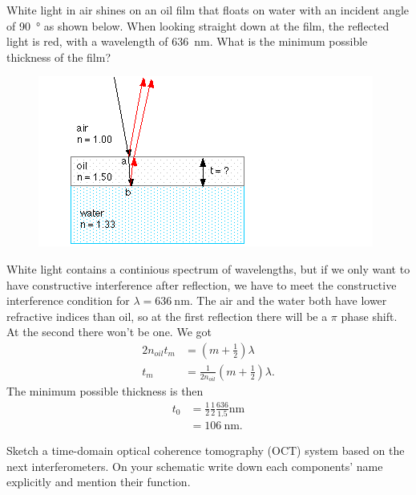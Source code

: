 \documentclass[answers, addpoints]{exam} %
\begin{document}
\begin{questions}
\question[10] White light in air shines on an oil film that floats on water with an incident angle of \SI{90}{\degree} as shown below.
When looking straight down at the film, the reflected light is red, with a wavelength of \SI{636}{\nano\meter}.
What is the minimum possible thickness of the film?
\begin{figure}[H]
	\centering
	\includegraphics[scale=1]{figures/oilfilm}
\end{figure}
\begin{solution}
	White light contains a continious spectrum of wavelengths, but if we only want to have constructive interference after reflection, we have to meet the constructive interference condition for $\lambda=\SI{636}{\nano\meter}$.
	The air and the water both have lower refractive indices than oil, so at the first reflection there will be a $\pi$ phase shift.
	At the second there won't be one.
	We got
	\begin{align*}
		2 n_{oil} t_m &= \left(m+\frac{1}{2}\right)\lambda \\
		t_m &= \frac{1}{2n_{oil}}\left(m+\frac{1}{2}\right)\lambda.
	\end{align*}
	The minimum possible thickness is then
	\begin{align*}
		t_0 &= \frac{1}{2}\frac{1}{2}\frac{636}{1.5}\si{\nano\meter} \\
		&= \SI{106}{\nano\meter}.
	\end{align*}
\end{solution}

\question[15] Sketch a time-domain optical coherence tomography (OCT) system based on the next interferometers.
On your schematic write down each components' name explicitly and mention their function.
\begin{parts}

\end{parts}
\end{questions}
\end{document}
